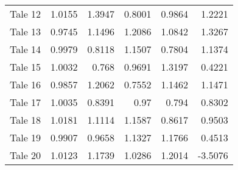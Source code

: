 \begin{table}[h]
\begin{tabular}{lrrrrr}
 Tale 12 &                        1.0155 &                      1.3947 &                        0.8001 &                          0.9864 &                         1.2221 \\
 Tale 13 &                        0.9745 &                      1.1496 &                        1.2086 &                          1.0842 &                         1.3267 \\
 Tale 14 &                        0.9979 &                      0.8118 &                        1.1507 &                          0.7804 &                         1.1374 \\
 Tale 15 &                        1.0032 &                      0.768  &                        0.9691 &                          1.3197 &                         0.4221 \\
 Tale 16 &                        0.9857 &                      1.2062 &                        0.7552 &                          1.1462 &                         1.1471 \\
 Tale 17 &                        1.0035 &                      0.8391 &                        0.97   &                          0.794  &                         0.8302 \\
 Tale 18 &                        1.0181 &                      1.1114 &                        1.1587 &                          0.8617 &                         0.9503 \\
 Tale 19 &                        0.9907 &                      0.9658 &                        1.1327 &                          1.1766 &                         0.4513 \\
 Tale 20 &                        1.0123 &                      1.1739 &                        1.0286 &                          1.2014 &                        -3.5076 \\
\bottomrule
\end{tabular}
\end{table}